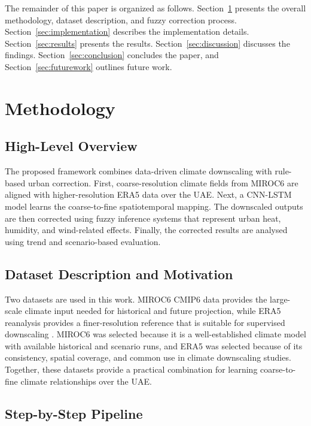 \documentclass[conference]{IEEEtran}
\begin{document}
The remainder of this paper is organized as follows. Section~\ref{sec:methodology} presents the overall methodology, dataset description, and fuzzy correction process. Section~\ref{sec:implementation} describes the implementation details. Section~\ref{sec:results} presents the results. Section~\ref{sec:discussion} discusses the findings. Section~\ref{sec:conclusion} concludes the paper, and Section~\ref{sec:futurework} outlines future work.


\section{Methodology}
\label{sec:methodology}


\subsection{High-Level Overview}

The proposed framework combines data-driven climate downscaling with rule-based urban correction. First, coarse-resolution climate fields from MIROC6 are aligned with higher-resolution ERA5 data over the UAE. Next, a CNN-LSTM model learns the coarse-to-fine spatiotemporal mapping. The downscaled outputs are then corrected using fuzzy inference systems that represent urban heat, humidity, and wind-related effects. Finally, the corrected results are analysed using trend and scenario-based evaluation.

\subsection{Dataset Description and Motivation}

Two datasets are used in this work. MIROC6 CMIP6 data provides the large-scale climate input needed for historical and future projection, while ERA5 reanalysis provides a finer-resolution reference that is suitable for supervised downscaling \cite{tatebe2019description,hersbach2020era5}. MIROC6 was selected because it is a well-established climate model with available historical and scenario runs, and ERA5 was selected because of its consistency, spatial coverage, and common use in climate downscaling studies. Together, these datasets provide a practical combination for learning coarse-to-fine climate relationships over the UAE.

\subsection{Step-by-Step Pipeline}
\end{document}
